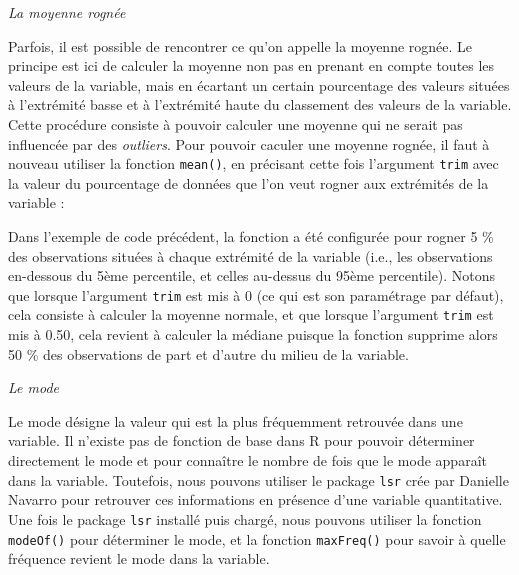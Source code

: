 \documentclass[
  french,
]{book}
\newenvironment{Shaded}{\begin{snugshade}}{\end{snugshade}}
\newcommand{\CommentTok}[1]{\textcolor[rgb]{0.56,0.35,0.01}{\textit{#1}}}
\newcommand{\DataTypeTok}[1]{\textcolor[rgb]{0.13,0.29,0.53}{#1}}
\newcommand{\FloatTok}[1]{\textcolor[rgb]{0.00,0.00,0.81}{#1}}
\newcommand{\KeywordTok}[1]{\textcolor[rgb]{0.13,0.29,0.53}{\textbf{#1}}}
\newcommand{\NormalTok}[1]{#1}
\newcommand{\OperatorTok}[1]{\textcolor[rgb]{0.81,0.36,0.00}{\textbf{#1}}}
\begin{document}
\emph{La moyenne rognée}

Parfois, il est possible de rencontrer ce qu'on appelle la moyenne rognée. Le principe est ici de calculer la moyenne non pas en prenant en compte toutes les valeurs de la variable, mais en écartant un certain pourcentage des valeurs situées à l'extrémité basse et à l'extrémité haute du classement des valeurs de la variable. Cette procédure consiste à pouvoir calculer une moyenne qui ne serait pas influencée par des \emph{outliers}. Pour pouvoir caculer une moyenne rognée, il faut à nouveau utiliser la fonction \texttt{mean()}, en précisant cette fois l'argument \texttt{trim} avec la valeur du pourcentage de données que l'on veut rogner aux extrémités de la variable :

\begin{Shaded}
\end{Shaded}

Dans l'exemple de code précédent, la fonction a été configurée pour rogner 5 \% des observations situées à chaque extrémité de la variable (i.e., les observations en-dessous du 5ème percentile, et celles au-dessus du 95ème percentile). Notons que lorsque l'argument \texttt{trim} est mis à 0 (ce qui est son paramétrage par défaut), cela consiste à calculer la moyenne normale, et que lorsque l'argument \texttt{trim} est mis à 0.50, cela revient à calculer la médiane puisque la fonction supprime alors 50 \% des observations de part et d'autre du milieu de la variable.

\emph{Le mode}

Le mode désigne la valeur qui est la plus fréquemment retrouvée dans une variable. Il n'existe pas de fonction de base dans R pour pouvoir déterminer directement le mode et pour connaître le nombre de fois que le mode apparaît dans la variable. Toutefois, nous pouvons utiliser le package \texttt{lsr} crée par Danielle Navarro \autocite*{navarroLearningStatistics2018} pour retrouver ces informations en présence d'une variable quantitative. Une fois le package \texttt{lsr} installé puis chargé, nous pouvons utiliser la fonction \texttt{modeOf()} pour déterminer le mode, et la fonction \texttt{maxFreq()} pour savoir à quelle fréquence revient le mode dans la variable.

\begin{Shaded}
\end{Shaded}
\end{document}
